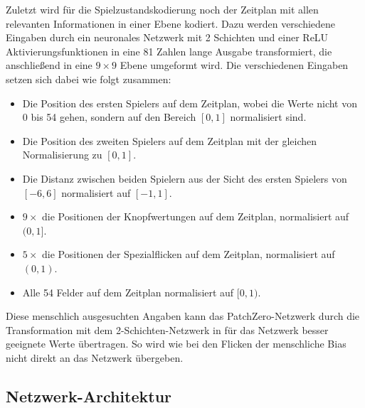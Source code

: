 \vspace*{-5cm}
\pagebreak

Zuletzt wird für die Spielzustandskodierung noch der Zeitplan mit allen relevanten Informationen in einer Ebene kodiert. Dazu werden verschiedene Eingaben durch ein neuronales Netzwerk mit 2 Schichten und einer \ac{ReLU} Aktivierungsfunktionen in eine 81 Zahlen lange Ausgabe transformiert, die anschließend in eine $9\times 9$ Ebene umgeformt wird. Die verschiedenen Eingaben setzen sich dabei wie folgt zusammen:

\begin{itemize}
    \item \vspace*{-0.1cm} Die Position des ersten Spielers auf dem Zeitplan, wobei die Werte nicht von 0 bis 54 gehen, sondern auf den Bereich $\left[0,1\right]$ normalisiert sind.
    \item \vspace*{-0.2cm} Die Position des zweiten Spielers auf dem Zeitplan mit der gleichen Normalisierung zu $\left[0,1\right]$.
    \item \vspace*{-0.2cm} Die Distanz zwischen beiden Spielern aus der Sicht des ersten Spielers von $\left[-6,6\right]$ normalisiert auf $\left[-1,1\right]$.
    \item \vspace*{-0.2cm} $9\times$ die Positionen der Knopfwertungen auf dem Zeitplan, normalisiert auf $(0,1]$.
    \item \vspace*{-0.2cm} $5\times$ die Positionen der Spezialflicken auf dem Zeitplan, normalisiert auf $(0,1)$.
    \item \vspace*{-0.2cm} Alle 54 Felder auf dem Zeitplan normalisiert auf $[0,1)$.
\end{itemize}
\vspace*{-0.1cm}

Diese menschlich ausgesuchten Angaben kann das PatchZero-Netzwerk durch die Transformation mit dem 2-Schichten-Netzwerk in für das Netzwerk besser geeignete Werte übertragen. So wird wie bei den Flicken der menschliche Bias nicht direkt an das Netzwerk übergeben.

\subsection{Netzwerk-Architektur}

